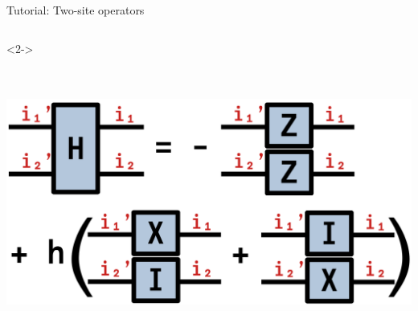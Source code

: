 \begin{frame}[fragile]{Tutorial: Two-site operators}
\begin{columns}
\begin{column}{5.5cm}
\begin{onlyenv}<2->
\vspace*{0.0cm}
~\\
~\\
~\\
\begin{center}
\includegraphics[width=1.0\textwidth]{
  slides/assets/ising12.png
}
\end{center}
\vspace*{0.0cm}
\end{onlyenv}

\end{column}

\end{columns}

\end{frame}
